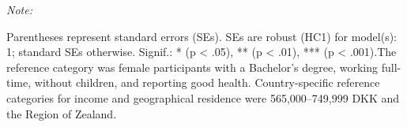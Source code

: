 {\begin{table}[H]
{\begin{threeparttable}
\begin{tabular}[t]{>{\raggedright\arraybackslash}p{7.6cm}>{\raggedleft\arraybackslash}p{2.30cm}>{\raggedleft\arraybackslash}p{2.30cm}>{\raggedleft\arraybackslash}p{2.30cm}}
\bottomrule
\end{tabular}
\begin{tablenotes}
\item \textit{Note: } 
\item Parentheses represent standard errors (SEs). SEs are robust (HC1) for model(s): 1; standard SEs otherwise. Signif.: * (p < .05), ** (p < .01), *** (p < .001).\newline The reference category was female participants with a Bachelor's degree, working full-time, without children, and reporting good health. Country-specific reference categories for income and geographical residence were 565,000--749,999 DKK and the Region of Zealand.
\end{tablenotes}
\end{threeparttable}}
\end{table}
}
